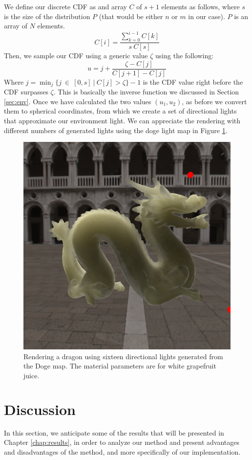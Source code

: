 We define our discrete CDF as and array $C$ of $s+1$ elements as follows, where $s$ is the size of the distribution $P$ (that would be either $n$ or $m$ in our case). $P$ is an array of $N$ elements.
$$
C[i] = \frac{\sum_{k = 0}^{i-1} C[k]}{s\ C[s]}
$$
Then, we sample our CDF using a generic value $\zeta$ using the following:
$$
u = j + \frac{\zeta - C[j]}{C[j + 1] - C[j]}
$$
Where $j = \min_j\{j\ \in\ [0,s]\ |\ C[j] > \zeta \} - 1$ is the CDF value right before the CDF surpasses $\zeta$. This is basically the inverse function we discussed in Section \ref{sec:env}. Once we have calculated the two values $(u_1,u_2)$, as before we convert them to spherical coordinates, from which we create a set of directional lights that approximate our environment light. We can appreciate the rendering with different numbers of generated lights using the doge light map in Figure \ref{fig:doge_render_grape}.

\begin{figure}
\centering

\includegraphics[width=0.9 \linewidth]{images/results/skymap_1.png}
\caption{Rendering a dragon using sixteen directional lights generated from the Doge map. The material parameters are for white grapefruit juice.}
\label{fig:doge_render_grape}
\end{figure}

\section{Discussion}
In this section, we anticipate some of the results that will be presented in Chapter \ref{chap:results}, in order to analyze our method and present advantages and disadvantages of the method, and more specifically of our implementation.

